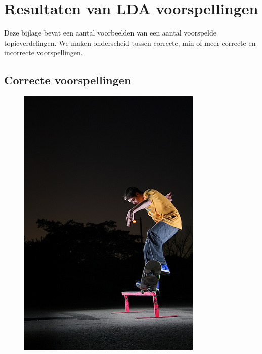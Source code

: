 \chapter{Resultaten van LDA voorspellingen}
\label{app:LDApredictions}
Deze bijlage bevat een aantal voorbeelden van een aantal voorspelde topicverdelingen. We maken onderscheid tussen correcte, min of meer correcte en incorrecte voorspellingen.
\section{Correcte voorspellingen}
\begin{figure}[!htb]
    \centering
    \begin{minipage}[t]{.5\linewidth}
    \centering
    \vspace{0pt}
    \includegraphics[width=\textwidth]{Images/LDA/2902844125.jpg}

\end{minipage}
\end{figure}
